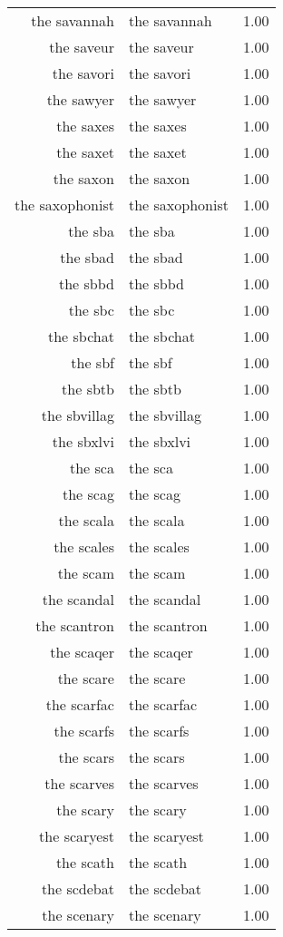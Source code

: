 \begin{table}[ht]
\begin{tabular}{rlr}
  the savannah & the savannah & 1.00 \\ 
  the saveur & the saveur & 1.00 \\ 
  the savori & the savori & 1.00 \\ 
  the sawyer & the sawyer & 1.00 \\ 
  the saxes & the saxes & 1.00 \\ 
  the saxet & the saxet & 1.00 \\ 
  the saxon & the saxon & 1.00 \\ 
  the saxophonist & the saxophonist & 1.00 \\ 
  the sba & the sba & 1.00 \\ 
  the sbad & the sbad & 1.00 \\ 
  the sbbd & the sbbd & 1.00 \\ 
  the sbc & the sbc & 1.00 \\ 
  the sbchat & the sbchat & 1.00 \\ 
  the sbf & the sbf & 1.00 \\ 
  the sbtb & the sbtb & 1.00 \\ 
  the sbvillag & the sbvillag & 1.00 \\ 
  the sbxlvi & the sbxlvi & 1.00 \\ 
  the sca & the sca & 1.00 \\ 
  the scag & the scag & 1.00 \\ 
  the scala & the scala & 1.00 \\ 
  the scales & the scales & 1.00 \\ 
  the scam & the scam & 1.00 \\ 
  the scandal & the scandal & 1.00 \\ 
  the scantron & the scantron & 1.00 \\ 
  the scaqer & the scaqer & 1.00 \\ 
  the scare & the scare & 1.00 \\ 
  the scarfac & the scarfac & 1.00 \\ 
  the scarfs & the scarfs & 1.00 \\ 
  the scars & the scars & 1.00 \\ 
  the scarves & the scarves & 1.00 \\ 
  the scary & the scary & 1.00 \\ 
  the scaryest & the scaryest & 1.00 \\ 
  the scath & the scath & 1.00 \\ 
  the scdebat & the scdebat & 1.00 \\ 
  the scenary & the scenary & 1.00 \\ 

\end{tabular}
\end{table}
